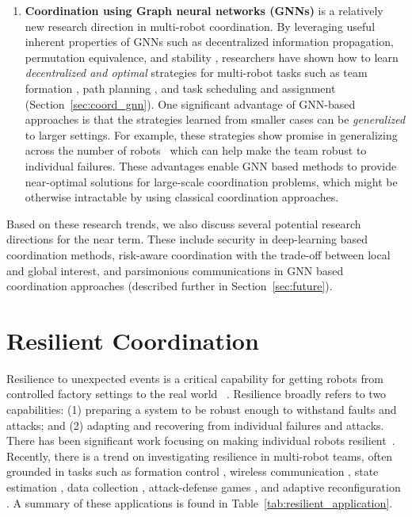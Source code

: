 \begin{enumerate}
    \item \textbf{Coordination using Graph neural networks (GNNs)} is a relatively new research direction in multi-robot coordination. By leveraging useful inherent properties of GNNs such as decentralized information propagation, permutation equivalence, and stability \cite{ruiz2020graph}, researchers have shown how to learn \textit{decentralized and optimal} strategies for multi-robot tasks such as team formation \cite{tolstaya2020learning}, path planning \cite{li2019graph}, and task scheduling and assignment \cite{wang2020learning} (Section~\ref{sec:coord_gnn}). One significant advantage of GNN-based approaches is that the strategies learned from smaller cases can be \textit{generalized} to larger settings. For example, these strategies show promise in generalizing across the number of robots~\cite{chen2020multi,prorok2018graph} which can help make the team robust to individual failures. These advantages enable GNN based methods to provide near-optimal solutions for large-scale coordination problems, which might be otherwise  intractable by using classical coordination approaches. 
\end{enumerate}
Based on these research trends, we also discuss several potential research directions for the near term. These include security in deep-learning based coordination methods, risk-aware coordination with the trade-off between local and global interest, and parsimonious communications in GNN based coordination approaches (described further in Section~\ref{sec:future}). 

\section{Resilient Coordination} \label{sec:resilient_coord}
Resilience to unexpected events is a critical capability for getting robots from controlled factory settings to the real world~ \cite{zhang2017resilient}. Resilience broadly refers to two capabilities: (1) preparing a system to be robust enough to withstand faults and attacks; and (2) adapting and recovering from individual failures and attacks. There has been significant work focusing on making individual robots resilient~\cite{bezzo2014attack,bezzo2016stochastic}. Recently, there is a trend on investigating resilience in multi-robot teams, often grounded in tasks such as formation control \cite{saulnier2017resilient,saldana2017resilient,leblanc2013resilient,renganathan2017spoof,saldana2018triangular,guerrero2018design,saldana2019resilient,guerrero2019realization,usevitch2019resilient,usevitch2020resilient,senejohnny2018resilience,senejohnny2019resilience}, wireless communication \cite{gil2017guaranteeing,sun2019resilient}, state estimation \cite{mitra2019resilient,mitra2016secure,mitra2018impact,mitra2019byzantine}, data collection \cite{zhou2018resilient,schlotfeldt2018resilient,zhou2019approximation,zhou2019distributed,shi2020robust}, attack-defense games \cite{shishika2018local,shishika2019team,shishika2020cooperative}, and adaptive reconfiguration \cite{ramachandran2019resilience,song2020care,ramachandran2020ICRA,ramachandran2020}. A summary of these applications is found in Table~\ref{tab:resilient_application}. 

